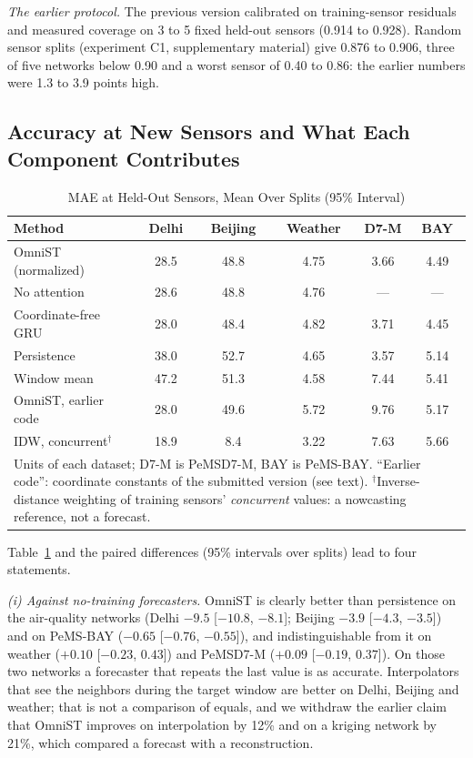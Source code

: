 \emph{The earlier protocol.} The previous version calibrated on training-sensor residuals and measured coverage on 3
to 5 fixed held-out sensors (0.914 to 0.928). Random sensor splits (experiment C1, supplementary material) give
0.876 to 0.906, three of five networks below 0.90 and a worst sensor of 0.40 to 0.86: the earlier numbers were 1.3 to 3.9
points high.

\subsection{Accuracy at New Sensors and What Each Component Contributes}
\label{sec:ablation}

\begin{table}[htbp]
\caption{MAE at Held-Out Sensors, Mean Over Splits (95\% Interval)}
\label{tab:accuracy}
\centering
\footnotesize
\setlength{\tabcolsep}{3.2pt}
\begin{tabular}{lccccc}
\toprule
\textbf{Method} & \textbf{Delhi} & \textbf{Beijing} & \textbf{Weather} & \textbf{D7-M} & \textbf{BAY} \\
\midrule
OmniST (normalized)    & 28.5 & 48.8 & 4.75 & 3.66 & 4.49 \\
No attention           & 28.6 & 48.8 & 4.76 & ---  & ---  \\
Coordinate-free GRU    & 28.0 & 48.4 & 4.82 & 3.71 & 4.45 \\
Persistence            & 38.0 & 52.7 & 4.65 & 3.57 & 5.14 \\
Window mean            & 47.2 & 51.3 & 4.58 & 7.44 & 5.41 \\
OmniST, earlier code   & 28.0 & 49.6 & 5.72 & 9.76 & 5.17 \\
\midrule
IDW, concurrent$^\dagger$ & 18.9 & 8.4 & 3.22 & 7.63 & 5.66 \\
\bottomrule
\multicolumn{6}{p{0.93\columnwidth}}{\footnotesize Units of each dataset; D7-M is PeMSD7-M, BAY is
PeMS-BAY. ``Earlier code'': coordinate constants of the submitted version (see text). $^\dagger$Inverse-distance
weighting of training sensors' \emph{concurrent} values: a nowcasting reference, not a forecast.} \\
\end{tabular}
\end{table}

Table~\ref{tab:accuracy} and the paired differences (95\% intervals over splits) lead to four
statements.

\emph{(i) Against no-training forecasters.} OmniST is clearly better than persistence on the
air-quality networks (Delhi $-9.5$ [$-10.8$, $-8.1$]; Beijing $-3.9$ [$-4.3$, $-3.5$]) and on PeMS-BAY
($-0.65$ [$-0.76$, $-0.55$]), and indistinguishable from it on weather ($+0.10$ [$-0.23$, $0.43$]) and
PeMSD7-M ($+0.09$ [$-0.19$, $0.37$]). On those two networks a forecaster that repeats the last value
is as accurate. Interpolators that see the neighbors during the target window are better on Delhi,
Beijing and weather; that is not a comparison of equals, and we withdraw the earlier claim that OmniST improves on
interpolation by 12\% and on a kriging network by 21\%, which compared a forecast with a reconstruction.

